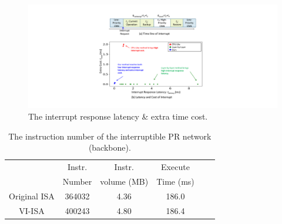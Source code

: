   


\begin{figure}[t]
  \centering
  \includegraphics[width=0.99\linewidth]{fig/PRresult.pdf}
  \caption{The interrupt response latency \& extra time cost.}
  \label{fig:scatter1024}
\end{figure}
\begin{table}[t]
  \small
  \centering
  \caption{The instruction number of the interruptible PR network (backbone). }
\begin{tabular}{|c|c|c|c|c|c|}
  \hline
         & Instr.  & Instr. & Execute \\
        & Number   & volume (MB) & Time (ms) \\
  \hline
  Original ISA   &      364032      & 4.36 & 186.0 \\
  \hline
  VI-ISA   &     400243    & 4.80 & 186.4 \\
  \hline
  \end{tabular}%
  \label{tab:instrnum}%
\end{table}%



